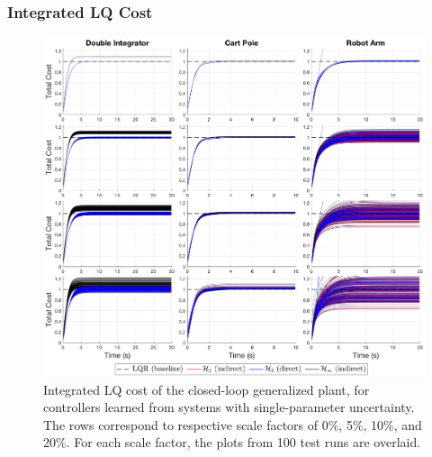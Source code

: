 \subsubsection{Integrated LQ Cost}
\begin{figure}[H]
\centering
	\includegraphics[width=\textwidth]{figures/uncertainty_integrated_cost3.png}
\caption{Integrated LQ cost of the closed-loop generalized plant, for controllers learned from systems with single-parameter uncertainty.  The rows correspond to respective scale factors of 0\%, 5\%, 10\%, and 20\%.  For each scale factor, the plots from 100 test runs are overlaid.}
\label{fig:uncertainty_integrated_cost3}
\end{figure}

\newpage
